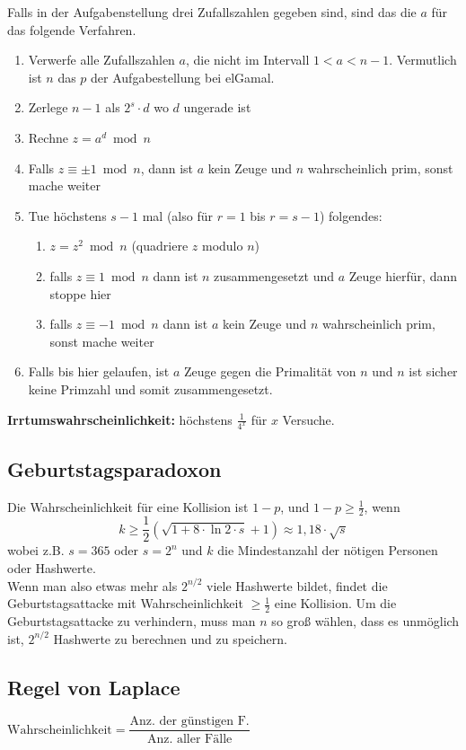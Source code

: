 \documentclass[8pt,a4paper,landscape]{article}
\begin{document}
\begin{multicols}{4}
Falls in der Aufgabenstellung drei Zufallszahlen gegeben sind, sind das die $a$ für das folgende Verfahren.
\begin{enumerate}[itemsep=1pt] 
    \item Verwerfe alle Zufallszahlen $a$, die nicht im Intervall $1 < a < n-1$. Vermutlich ist $n$ das $p$ der Aufgabestellung bei elGamal.
    \item Zerlege $n-1$ als $2^{s} \cdot d$ wo $d$ ungerade ist
    \item Rechne $z = a^d \bmod n$
    \item Falls $z \equiv \pm 1 \bmod n$, dann ist $a$ kein Zeuge und $n$
          wahrscheinlich prim, sonst mache weiter
    \item Tue höchstens $s-1$ mal (also für $r=1$ bis $r=s-1$) folgendes:
          \begin{enumerate}[itemsep=1pt] 
              \item $z = z^2 \bmod n$ (quadriere $z$ modulo $n$)
              \item falls $z \equiv 1 \bmod n$ dann ist $n$ zusammengesetzt und $a$ Zeuge hierfür, dann stoppe hier
              \item falls $z \equiv -1 \bmod n$ dann ist $a$ kein Zeuge und $n$ wahrscheinlich prim, sonst mache weiter
          \end{enumerate}
    \item Falls bis hier gelaufen, ist $a$ Zeuge gegen die Primalität von
          $n$ und $n$ ist sicher keine Primzahl und somit zusammengesetzt.
\end{enumerate}
\textbf{Irrtumswahrscheinlichkeit:} höchstens $\frac{1}{4^x}$ für $x$ Versuche.

\subsection{Geburtstagsparadoxon}
Die Wahrscheinlichkeit für eine Kollision ist $1-p$, und $1-p \geq \frac{1}{2}$, wenn 
\[
k \geq  \frac{1}{2} \left( \sqrt{1 + 8 \cdot \ln 2 \cdot s} + 1 \right) \approx 1,18 \cdot \sqrt{s}  
\]
wobei z.B. $s=365$ oder $s=2^n$ und $k$ die Mindestanzahl der nötigen Personen oder Hashwerte. \\
Wenn man also etwas mehr als $2^{n/2}$ viele Hashwerte bildet, findet die Geburtstagsattacke mit Wahrscheinlichkeit $\geq \frac{1}{2}$ eine Kollision. Um die Geburtstagsattacke zu verhindern, muss man $n$ so groß wählen, dass es unmöglich ist, $2^{n/2}$ Hashwerte zu berechnen und zu speichern.
\subsection{Regel von Laplace}
$\textrm{Wahrscheinlichkeit} = \dfrac{\textrm{Anz. der günstigen F.}}{\textrm{Anz. aller Fälle}}$


\end{multicols}
\end{document}
